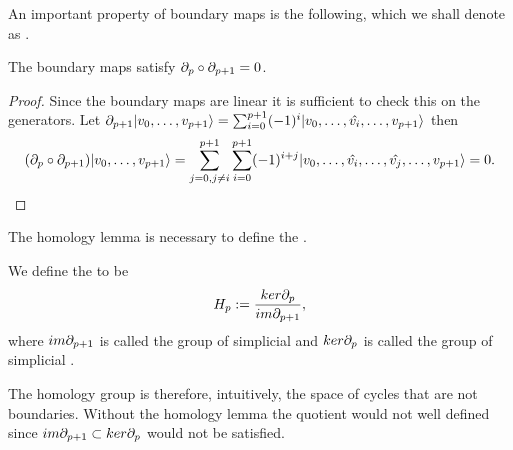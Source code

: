 \documentclass[../1.tex]{subfiles}
\begin{document}
    An important property of boundary maps is the following, which we shall denote as .

    \begin{lem}
        The boundary maps satisfy $\partial_p \circ \partial_{p+1} = 0$.
    \end{lem}
    \begin{proof}
        Since the boundary maps are linear it is sufficient to check this on the generators.
        Let $\partial_{p+1}| v_0,\dots,v_{p+1} \rangle = \sum_{i=0}^{p+1} (-1)^i| v_0,\dots,\hat{v_i},\dots,v_{p+1} \rangle$ then 
        \[(\partial_p \circ \partial_{p+1})| v_0,\dots,v_{p+1} \rangle = \sum_{j=0, j \neq i}^{p+1} \sum_{i=0}^{p+1} (-1)^{i+j}| v_0,\dots,\hat{v_i},\dots,\hat{v_j},\dots,v_{p+1} \rangle = 0. \qedhere \]     
    \end{proof}

    The homology lemma is necessary to define the .

    \begin{defn}
        We define the  to be 
        \[H_p := \frac{ker\partial_p}{im\partial_{p+1}},\] 
        where $im\partial_{p+1}$ is called the group of simplicial  and
        $ker\partial_p$ is called the group of simplicial .
    \end{defn}

    The homology group is therefore, intuitively,  the space of cycles that are not boundaries. Without the
    homology lemma the quotient would not well defined since $im\partial_{p+1} \subset ker\partial_p$ would not be satisfied.
\end{document}
